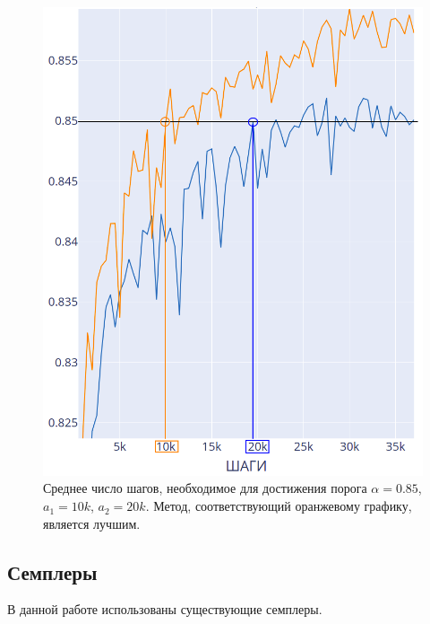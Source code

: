 \documentclass{spbau-diploma}
\begin{document}
\begin{figure}[h]
	\centering
	\includegraphics[scale=0.3]{compare}
	\caption{Среднее число шагов, необходимое для достижения порога $\alpha = 0.85$, $a_1 = 10k$, $a_2 = 20k$. Метод, соответствующий оранжевому графику, является лучшим.}
	\label{fig:metrics_compare}
\end{figure}

\pagebreak
\subsection{Семплеры}

В данной работе использованы существующие семплеры.
\end{document}
